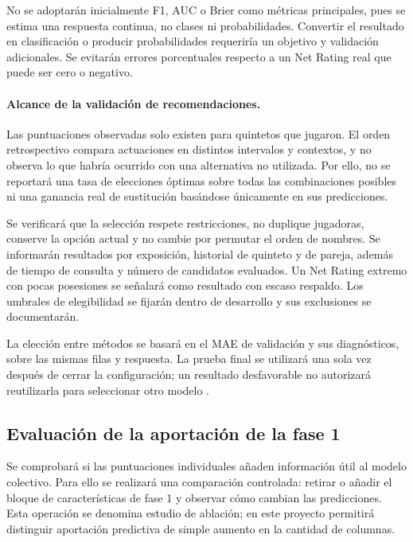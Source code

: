 No se adoptarán inicialmente F1, AUC o Brier como métricas principales, pues se estima una respuesta continua, no clases ni probabilidades. Convertir el resultado en clasificación o producir probabilidades requeriría un objetivo y validación adicionales. Se evitarán errores porcentuales respecto a un Net Rating real que puede ser cero o negativo.

\paragraph*{Alcance de la validación de recomendaciones.}
Las puntuaciones observadas solo existen para quintetos que jugaron. El orden retrospectivo compara actuaciones en distintos intervalos y contextos, y no observa lo que habría ocurrido con una alternativa no utilizada. Por ello, no se reportará una tasa de elecciones óptimas sobre todas las combinaciones posibles ni una ganancia real de sustitución basándose únicamente en sus predicciones.

Se verificará que la selección respete restricciones, no duplique jugadoras, conserve la opción actual y no cambie por permutar el orden de nombres. Se informarán resultados por exposición, historial de quinteto y de pareja, además de tiempo de consulta y número de candidatos evaluados. Un Net Rating extremo con pocas posesiones se señalará como resultado con escaso respaldo. Los umbrales de elegibilidad se fijarán dentro de desarrollo y sus exclusiones se documentarán.

La elección entre métodos se basará en el MAE de validación y sus diagnósticos, sobre las mismas filas y respuesta. La prueba final se utilizará una sola vez después de cerrar la configuración; un resultado desfavorable no autorizará reutilizarla para seleccionar otro modelo \cite{cawley2010selection}.

\subsection{Evaluación de la aportación de la fase 1}
\label{subsec:aportacion-fase1}
Se comprobará si las puntuaciones individuales añaden información útil al modelo colectivo. Para ello se realizará una comparación controlada: retirar o añadir el bloque de características de fase 1 y observar cómo cambian las predicciones. Esta operación se denomina estudio de ablación; en este proyecto permitirá distinguir aportación predictiva de simple aumento en la cantidad de columnas.

